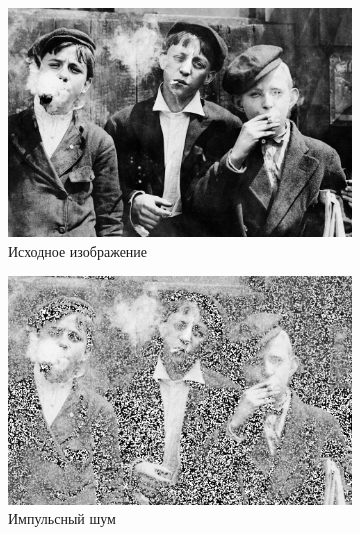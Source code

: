   \begin{figure}[ht!] 
    \centering
    \begin{subfigure}[b]{0.5\linewidth}
        \centering
        \includegraphics[width=0.95\linewidth]{../lewis-hine-taschen-main-3.jpg} 
        \caption{Исходное изображение} 
        \label{contraharmonic_1.85:a} 
        \vspace{4ex}
    \end{subfigure}%
    \begin{subfigure}[b]{0.5\linewidth}
      \centering
      \includegraphics[width=0.95\linewidth]{../Contraharmonic_Filter/Contraharmonic_Impulse_noise_(m,n=(3,_3),q=1.85).jpg} 
      \caption{Импульсный шум} 
      \label{contraharmonic_1.85:b} 
      \vspace{4ex}
    \end{subfigure}
    \begin{subfigure}[b]{0.5\linewidth}
      \centering

\end{subfigure}
\end{figure}
